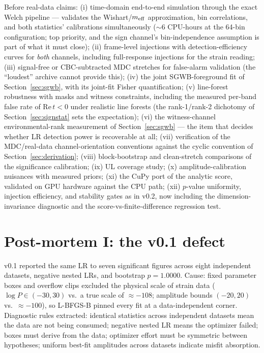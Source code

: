 \documentclass[11pt]{article}
\begin{document}
Before real-data claims: (i) time-domain end-to-end simulation through the exact Welch pipeline --- validates the Wishart/$m_{\rm eff}$ approximation, bin correlations, and both statistics' calibrations simultaneously ($\sim$6 CPU-hours at the 64-bin configuration; top priority, and the sign channel's bin-independence assumption is part of what it must close); (ii) frame-level injections with detection-efficiency curves for \emph{both} channels, including full-response injections for the strain reading; (iii) signal-free or CBC-subtracted MDC stretches for false-alarm validation (the ``loudest'' archive cannot provide this); (iv) the joint SGWB-foreground fit of Section~\ref{sec:sgwb}, with its joint-fit Fisher quantification; (v) line-forest robustness with masks and witness constraints, including the measured per-band false rate of $\mathrm{Re}\,t < 0$ under realistic line forests (the rank-1/rank-2 dichotomy of Section~\ref{sec:signstat} sets the expectation); (vi) the witness-channel environmental-rank measurement of Section~\ref{sec:sgwb} --- the item that decides whether LR detection power is recoverable at all; (vii) verification of the MDC/real-data channel-orientation conventions against the cyclic convention of Section~\ref{sec:derivation}; (viii) block-bootstrap and clean-stretch comparisons of the significance calibration; (ix) UL coverage study; (x) amplitude-calibration nuisances with measured priors; (xi) the CuPy port of the analytic score, validated on GPU hardware against the CPU path; (xii) $p$-value uniformity, injection efficiency, and stability gates as in v0.2, now including the dimension-invariance diagnostic and the score-vs-finite-difference regression test.

\appendix

\section{Post-mortem I: the v0.1 defect}
\label{app:postmortem1}

v0.1 reported the same LR to seven significant figures across eight independent datasets, negative nested LRs, and bootstrap $p = 1.0000$. Cause: fixed parameter boxes and overflow clips excluded the physical scale of strain data ($\log P \in (-30,30)$ vs.\ a true scale of $\approx -108$; amplitude bounds $(-20,20)$ vs.\ $\approx -100$), so L-BFGS-B pinned every fit at a data-independent corner. Diagnostic rules extracted: identical statistics across independent datasets mean the data are not being consumed; negative nested LR means the optimizer failed; boxes must derive from the data; optimizer effort must be symmetric between hypotheses; uniform best-fit amplitudes across datasets indicate misfit absorption.
\end{document}
